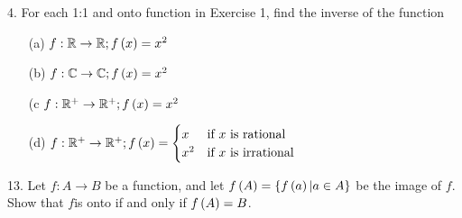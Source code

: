 \begin{mdframed}[style=darkAnswer,frametitle={Joe Starr}]

\end{mdframed}
\newpage
\begin{mdframed}[style=darkQuesion]
  4.   For each 1:1 and onto function in Exercise 1, find the inverse of the 
  function
\begin{itemize}
  \item [(a)]{
    $f:\mathbb{R}\to \mathbb{R}; f\left(x\right)=x^2$
  }
  \item [(b)]{
    $f:\mathbb{C}\to \mathbb{C}; f\left(x\right)=x^2$
  }
  \item [(c]{
    $f:\mathbb{R}^+\to \mathbb{R}^+; f\left(x\right)=x^2$
  }
  \item [(d)]{
    $f:\mathbb{R}^+\to \mathbb{R}^+; f\left(x\right)=
    \begin{cases}
      x &\text{if }x\text{ is rational}\\
      x^2 &\text{if }x\text{ is irrational}\\
    \end{cases}$
  }
\end{itemize}
\end{mdframed}

\begin{mdframed}[style=darkAnswer,frametitle={Joe Starr}]

\end{mdframed}
\newpage
\begin{mdframed}[style=darkQuesion]
  13. Let $f:A\to B$ be a function, and let $f\left(A\right)=\left\{f\left(a\right)\vert a\in A\right\}$
  be the image of $f$. Show that $f$is onto if and only if $f\left(A\right)=B$.
\end{mdframed}

